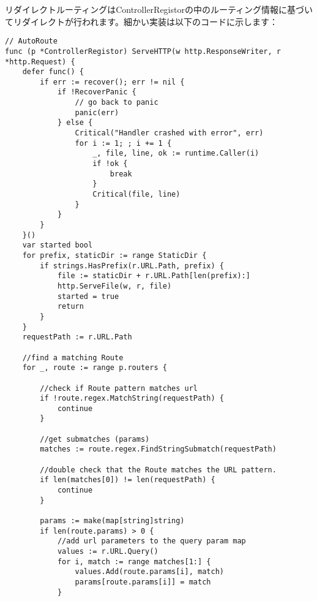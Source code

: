 リダイレクトルーティングはControllerRegistorの中のルーティング情報に基づいてリダイレクトが行われます。細かい実装は以下のコードに示します：

\begin{lstlisting}[numbers=none]
// AutoRoute
func (p *ControllerRegistor) ServeHTTP(w http.ResponseWriter, r *http.Request) {
    defer func() {
        if err := recover(); err != nil {
            if !RecoverPanic {
                // go back to panic
                panic(err)
            } else {
                Critical("Handler crashed with error", err)
                for i := 1; ; i += 1 {
                    _, file, line, ok := runtime.Caller(i)
                    if !ok {
                        break
                    }
                    Critical(file, line)
                }
            }
        }
    }()
    var started bool
    for prefix, staticDir := range StaticDir {
        if strings.HasPrefix(r.URL.Path, prefix) {
            file := staticDir + r.URL.Path[len(prefix):]
            http.ServeFile(w, r, file)
            started = true
            return
        }
    }
    requestPath := r.URL.Path

    //find a matching Route
    for _, route := range p.routers {

        //check if Route pattern matches url
        if !route.regex.MatchString(requestPath) {
            continue
        }

        //get submatches (params)
        matches := route.regex.FindStringSubmatch(requestPath)

        //double check that the Route matches the URL pattern.
        if len(matches[0]) != len(requestPath) {
            continue
        }

        params := make(map[string]string)
        if len(route.params) > 0 {
            //add url parameters to the query param map
            values := r.URL.Query()
            for i, match := range matches[1:] {
                values.Add(route.params[i], match)
                params[route.params[i]] = match
            }


\end{lstlisting}
